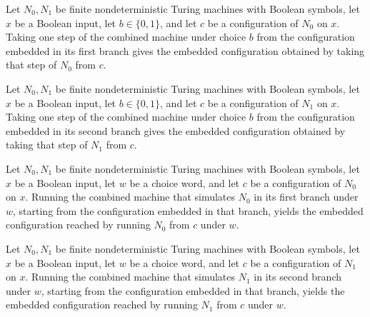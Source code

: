 \begin{theorem}
\leanok
{}
Let $N_0,N_1$ be finite nondeterministic Turing machines with Boolean symbols, let $x$
be a Boolean input, let $b\in\{0,1\}$, and let $c$ be a configuration of $N_0$ on $x$.
Taking one step of the combined machine under choice $b$ from the configuration embedded
in its first branch gives the embedded configuration obtained by taking that step of
$N_0$ from $c$.
\end{theorem}

\begin{theorem}
\leanok
{}
Let $N_0,N_1$ be finite nondeterministic Turing machines with Boolean symbols, let $x$
be a Boolean input, let $b\in\{0,1\}$, and let $c$ be a configuration of $N_1$ on $x$.
Taking one step of the combined machine under choice $b$ from the configuration embedded
in its second branch gives the embedded configuration obtained by taking that step of
$N_1$ from $c$.
\end{theorem}

\begin{theorem}
\leanok
{}
Let $N_0,N_1$ be finite nondeterministic Turing machines with Boolean symbols, let $x$
be a Boolean input, let $w$ be a choice word, and let $c$ be a configuration of $N_0$ on
$x$. Running the combined machine that simulates $N_0$ in its first branch under $w$,
starting from the configuration embedded in that branch, yields the embedded
configuration reached by running $N_0$ from $c$ under $w$.
\end{theorem}

\begin{theorem}
\leanok
{}
Let $N_0,N_1$ be finite nondeterministic Turing machines with Boolean symbols, let $x$
be a Boolean input, let $w$ be a choice word, and let $c$ be a configuration of $N_1$ on
$x$. Running the combined machine that simulates $N_1$ in its second branch under $w$,
starting from the configuration embedded in that branch, yields the embedded
configuration reached by running $N_1$ from $c$ under $w$.
\end{theorem}

